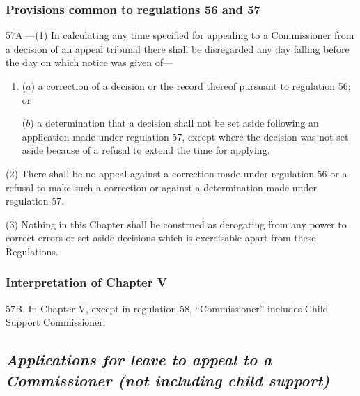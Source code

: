 \documentclass[12pt,a4paper]{article}
\begin{document}
\subsubsection[57A. Provisions common to regulations 56 and 57]{Provisions common to regulations 56 and 57}

57A.---(1)  In calculating any time specified for appealing to a Commissioner from a decision of an appeal tribunal there shall be disregarded any day falling before the day on which notice was given of—
\begin{enumerate}\item[]
($a$) a correction of a decision or the record thereof pursuant to regulation 56; or

($b$) a determination that a decision shall not be set aside following an application made under regulation 57, except where the decision was not set aside because of a refusal to extend the time for applying.
\end{enumerate}

(2) There shall be no appeal against a correction made under regulation 56 or a refusal to make such a correction or against a determination made under regulation 57.

(3) Nothing in this Chapter shall be construed as derogating from any power to correct errors or set aside decisions which is exercisable apart from these Regulations.


\subsubsection[57B. Interpretation of Chapter V]{Interpretation of Chapter V}

57B.  In Chapter V, except in regulation 58, “Commissioner” includes Child Support Commissioner.


\subsection{\itshape Applications for leave to appeal to a Commissioner (not including child support)}
\end{document}
